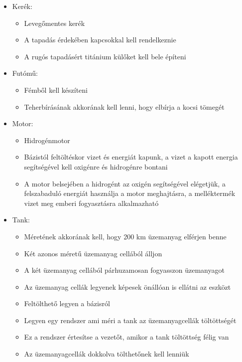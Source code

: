\documentclass[12pt]{report}
\begin{document}
\begin{itemize}
    \item Kerék:
        \begin{itemize}
            \item Levegőmentes kerék
            \item A tapadás érdekében kapcsokkal kell rendelkeznie
            \item A rugós tapadásért titánium külőket kell bele építeni
        \end{itemize}
    \item Futómű:
        \begin{itemize}
            \item Fémből kell készíteni
            \item Teherbírásának akkorának kell lenni, hogy elbírja a kocsi tömegét
        \end{itemize}
    \item Motor:
        \begin{itemize}
            \item Hidrogénmotor
            \item Bázistól feltöltéskor vizet és energiát kapunk, a vizet a kapott energia segítségével kell oxigénre és hidrogénre bontani
            \item A motor belsejében a hidrogént az oxigén segítségével elégetjük, a felszabaduló energiát használja a motor meghajtásra, a melléktermék vizet meg emberi fogyasztásra alkalmazható
        \end{itemize}
    \item Tank:
        \begin{itemize}
            \item Méretének akkorának kell, hogy 200 km üzemanyag elférjen benne
            \item Két azonos méretű üzemanyag cellából álljon
            \item A két üzemanyag cellából párhuzamosan fogyasszon üzemanyagot
            \item Az üzemanyag cellák legyenek képesek önállóan is ellátni az eszközt
            \item Feltölthető legyen a bázisról
            \item Legyen egy rendszer ami méri a tank az üzemanyagcellák töltöttségét
            \item Ez a rendszer értesítse a vezetőt, amikor a tank töltöttség félig van
            \item Az üzemanyagcellák dokkolva tölthetőnek kell lenniük

\end{itemize}
\end{itemize}
\end{document}
